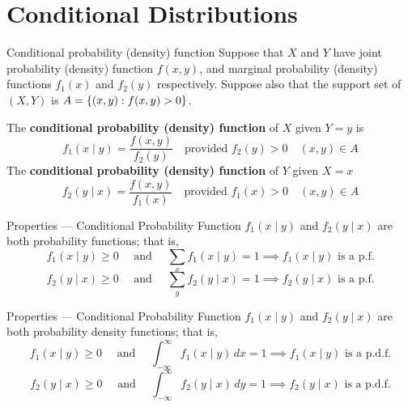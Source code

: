 \section{Conditional Distributions}
\begin{Definition}{Conditional probability (density) function}{}
    Suppose that $ X $ and $ Y $ have joint probability
    (density) function $ f(x,y) $,
    and marginal probability (density) functions
    $ f_1(x) $ and $ f_2(y) $ respectively.
    Suppose also that the support set
    of $ (X,Y) $ is $ A=\{(x,y):f(x,y)>0\} $.

    The \textbf{conditional probability (density) function}
    of $ X $ given $ Y=y $ is
    \[ f_1(x\mid y)=\frac{f(x,y)}{f_2(y)}\quad\text{provided } f_2(y)>0\quad (x,y)\in A \]
    The \textbf{conditional probability (density) function} of $ Y $ given $ X=x $
    \[ f_2(y\mid x)=\frac{f(x,y)}{f_1(x)}\quad\text{provided } f_1(x)>0\quad (x,y)\in A \]
\end{Definition}
\begin{Proposition}{Properties --- Conditional Probability Function}{}
    $ f_1(x\mid y) $ and $ f_2(y\mid x) $ are both probability functions;
    that is,
    \[ f_1(x\mid y)\ge 0 \quad\text{ and }\quad
        \sum_{x}f_1(x\mid y)=1\implies f_1(x\mid y)\text{ is a p.f.}\]
    \[ f_2(y\mid x)\ge 0 \quad\text{ and }\quad
        \sum_{y}f_2(y\mid x)=1\implies f_2(y\mid x)\text{ is a p.f.}\]
\end{Proposition}
\begin{Proposition}{Properties --- Conditional Probability Function}{}
    $ f_1(x\mid y) $ and $ f_2(y\mid x) $ are both probability density functions;
    that is,
    \[ f_1(x\mid y)\ge 0 \quad\text{ and }\quad
        \int_{-\infty}^{\infty} f_1(x\mid y)\, d{x} =1\implies f_1(x\mid y)\text{ is a p.d.f.}\]
    \[ f_2(y\mid x)\ge 0 \quad\text{ and }\quad
        \int_{-\infty}^{\infty} f_2(y\mid x)\, d{y}=1\implies f_2(y\mid x)\text{ is a p.d.f.}\]
\end{Proposition}
